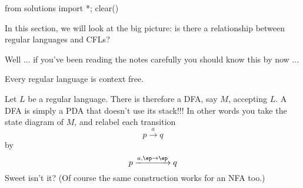 \begin{python0}
from solutions import *; clear()
\end{python0}

In this section, we will look at the big picture:
is there a relationship between regular languages and CFLs?

Well ... if you've been reading the notes carefully you should
know this by now ...

\begin{thm}
Every regular language is context free.
\end{thm}

Let $L$ be a regular language.
There is therefore a DFA, say $M$, accepting $L$.
A DFA is simply a PDA that doesn't use its stack!!!
In other words you take the state diagram of $M$, and relabel each transition
\[
p \xrightarrow{a} q
\]
by
\[
p \xrightarrow{a, \ep \rightarrow \ep} q
\]
Sweet isn't it? 
(Of course the same construction works for an NFA too.)

